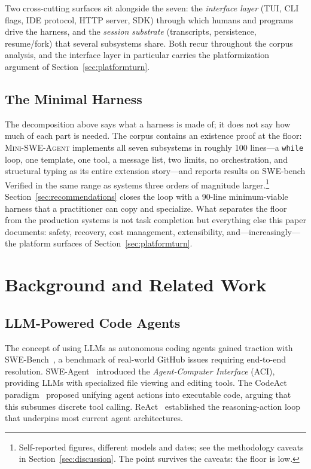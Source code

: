 \documentclass[11pt,a4paper]{article}
\newcommand{\mswe}{\textsc{Mini-SWE-Agent}\xspace}
\begin{document}
Two cross-cutting surfaces sit alongside the seven: the \emph{interface layer} (TUI, CLI flags, IDE protocol, HTTP server, SDK) through which humans and programs drive the harness, and the \emph{session substrate} (transcripts, persistence, resume/fork) that several subsystems share.
Both recur throughout the corpus analysis, and the interface layer in particular carries the platformization argument of Section~\ref{sec:platformturn}.

\subsection{The Minimal Harness}
\label{sec:minimalharness}

The decomposition above says what a harness is made of; it does not say how much of each part is needed.
The corpus contains an existence proof at the floor: \mswe{} implements all seven subsystems in roughly 100 lines---a \texttt{while} loop, one template, one tool, a message list, two limits, no orchestration, and structural typing as its entire extension story---and reports results on SWE-bench Verified in the same range as systems three orders of magnitude larger.\footnote{Self-reported figures, different models and dates; see the methodology caveats in Section~\ref{sec:discussion}. The point survives the caveats: the floor is low.}
Section~\ref{sec:recommendations} closes the loop with a 90-line minimum-viable harness that a practitioner can copy and specialize.
What separates the floor from the production systems is not task completion but everything else this paper documents: safety, recovery, cost management, extensibility, and---increasingly---the platform surfaces of Section~\ref{sec:platformturn}.

\section{Background and Related Work}
\label{sec:background}

\subsection{LLM-Powered Code Agents}

The concept of using LLMs as autonomous coding agents gained traction with SWE-Bench~\cite{jimenez2024swebench}, a benchmark of real-world GitHub issues requiring end-to-end resolution.
SWE-Agent~\cite{yang2024sweagent} introduced the \emph{Agent-Computer Interface} (ACI), providing LLMs with specialized file viewing and editing tools.
The CodeAct paradigm~\cite{wang2024codeact} proposed unifying agent actions into executable code, arguing that this subsumes discrete tool calling.
ReAct~\cite{yao2023react} established the reasoning-action loop that underpins most current agent architectures.
\end{document}
